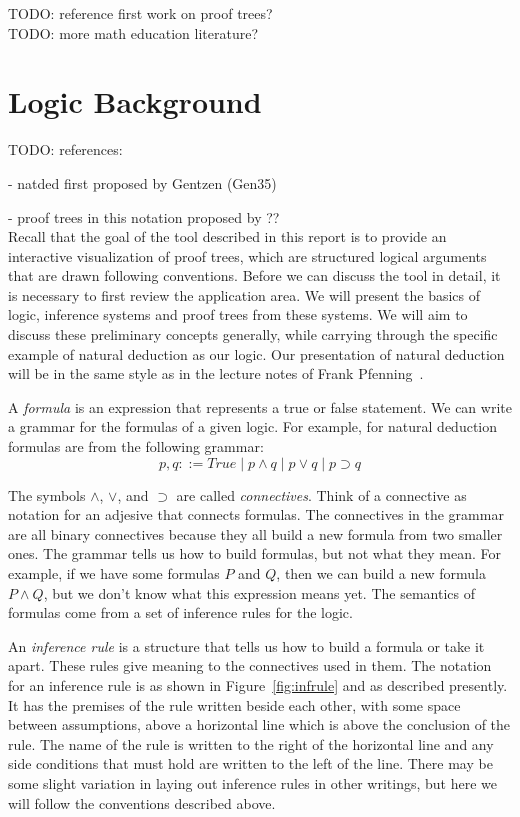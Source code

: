 \documentclass[conference]{IEEEtran}
\begin{document}
TODO: reference first work on proof trees? \\

TODO: more math education literature? \\

\section{Logic Background}
\label{sec:background}

TODO: references:

- natded first proposed by Gentzen (Gen35)

- proof trees in this notation proposed by ?? \\

Recall that the goal of the tool described in this report is to provide an interactive visualization of proof trees, which are structured logical arguments that are drawn following conventions. Before we can discuss the tool in detail, it is necessary to first review the application area. We will present the basics of logic, inference systems and proof trees from these systems. We will aim to discuss these preliminary concepts generally, while carrying through the specific example of natural deduction as our logic. Our presentation of natural deduction will be in the same style as in the lecture notes of Frank Pfenning~\cite{natded-pfenning}.

A \textit{formula} is an expression that represents a true or false statement. We can write a grammar for the formulas of a given logic. For example, for natural deduction formulas are from the following grammar:
$$
p, q ::= \mathit{True} \; | \; p \wedge q \; | \; p \vee q \; | \; p \supset q
$$

The symbols $\wedge$, $\vee$, and $\supset$ are called \textit{connectives}. Think of a connective as notation for an adjesive that connects formulas. The connectives in the grammar are all binary connectives because they all build a new formula from two smaller ones. The grammar tells us how to build formulas, but not what they mean. For example, if we have some formulas $P$ and $Q$, then we can build a new formula $P \wedge Q$, but we don't know what this expression means yet. The semantics of formulas come from a set of inference rules for the logic.

An \textit{inference rule} is a structure that tells us how to build a formula or take it apart. These rules give meaning to the connectives used in them. The notation for an inference rule is as shown in Figure~\ref{fig:infrule} and as described presently. It has the premises of the rule written beside each other, with some space between assumptions, above a horizontal line which is above the conclusion of the rule. The name of the rule is written to the right of the horizontal line and any side conditions that must hold are written to the left of the line. There may be some slight variation in laying out inference rules in other writings, but here we will follow the conventions described above.
\end{document}
